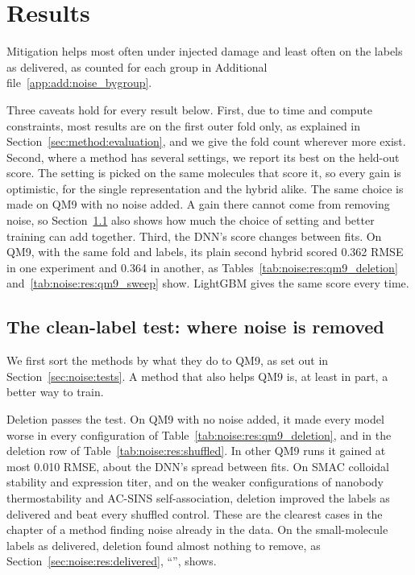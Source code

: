\section{Results}

Mitigation helps most often under injected damage and least often on the labels as delivered, as counted for each group in Additional file~\ref{app:add:noise_bygroup}.

Three caveats hold for every result below. First, due to time and compute constraints, most results are on the first outer fold only, as explained in Section~\ref{sec:method:evaluation}, and we give the fold count wherever more exist. Second, where a method has several settings, we report its best on the held-out score. The setting is picked on the same molecules that score it, so every gain is optimistic, for the single representation and the hybrid alike. The same choice is made on QM9 with no noise added. A gain there cannot come from removing noise, so Section~\ref{sec:noise:res:qm9test} also shows how much the choice of setting and better training can add together. Third, the DNN's score changes between fits. On QM9, with the same fold and labels, its plain second hybrid scored 0.362 RMSE in one experiment and 0.364 in another, as Tables~\ref{tab:noise:res:qm9_deletion} and~\ref{tab:noise:res:qm9_sweep} show. LightGBM gives the same score every time.

\subsection{The clean-label test: where noise is removed}\label{sec:noise:res:qm9test}

We first sort the methods by what they do to QM9, as set out in Section~\ref{sec:noise:tests}. A method that also helps QM9 is, at least in part, a better way to train.

Deletion passes the test. On QM9 with no noise added, it made every model worse in every configuration of Table~\ref{tab:noise:res:qm9_deletion}, and in the deletion row of Table~\ref{tab:noise:res:shuffled}. In other QM9 runs it gained at most 0.010 RMSE, about the DNN's spread between fits. On SMAC colloidal stability and expression titer, and on the weaker configurations of nanobody thermostability and AC-SINS self-association, deletion improved the labels as delivered and beat every shuffled control. These are the clearest cases in the chapter of a method finding noise already in the data. On the small-molecule labels as delivered, deletion found almost nothing to remove, as Section~\ref{sec:noise:res:delivered}, ``'', shows.

